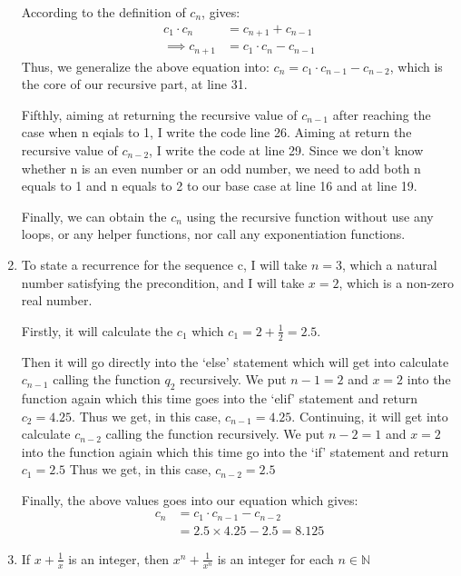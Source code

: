 \documentclass[12pt]{article}
\begin{document}
\begin{enumerate}[label=(\alph*)]
\noindent According to the definition of $c_n$, gives:
\begin{align*}
    c_1 \cdot c_n &= c_{n+1} + c_{n-1} \\
    \implies c_{n+1} &= c_1 \cdot c_n - c_{n-1}
\end{align*}
\noindent Thus, we generalize the above equation into: $c_{n} = c_1 \cdot c_{n-1} - c_{n-2} $, which is the core of our recursive part, at line 31.

\noindent Fifthly, aiming at returning the recursive value of $c_{n-1}$ after reaching the case when n eqials to 1, I write the code line 26.
Aiming at return the recursive value of $c_{n-2}$, I write the code at line 29.
Since we don't know whether n is an even number or an odd number, we need to add both n equals to 1 and n equals to 2 to our base case at line 16 and at line 19.

\noindent Finally, we can obtain the $c_n$ using the recursive function without use any loops, or any helper functions, nor call any exponentiation functions.

    \item To state a recurrence for the sequence c, I will take $n=3$, which a natural number satisfying the precondition, and I will take $x = 2$, which is a non-zero real number.
    
    Firstly, it will calculate the $c_1$ which $c_1 = 2 + \frac{1}{2} = 2.5$.
    
    Then it will go directly into the `else' statement which will get into calculate $c_{n-1}$ calling the function $q_2$ recursively.
    We put $n-1 = 2$ and $x=2$ into the function again which this time goes into the `elif' statement and return $c_2 = 4.25$.
    Thus we get, in this case, $c_{n-1} = 4.25$.
    Continuing, it will get into calculate $c_{n-2}$ calling the function recursively.
    We put $n-2 = 1 $ and $x = 2$ into the function agiain which this time go into the `if' statement and return $c_1 = 2.5$
    Thus we get, in this case, $c_{n-2} = 2.5$

    Finally, the above values goes into our equation which gives:
    \begin{align*}
        c_n &= c_1 \cdot c_{n-1} - c_{n-2} \\
        &= 2.5 \times 4.25 - 2.5 = 8.125
    \end{align*}

    \item If $x+\frac{1}{x}$ is an integer, then $x^n + \frac{1}{x^n} $ is an integer for each $n \in \mathbb{N}$
    

\end{enumerate}
\end{document}
